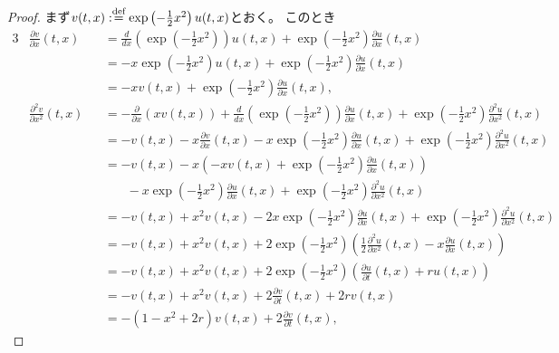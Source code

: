\documentclass[uplatex]{jsarticle}
\theoremstyle{definition}
\def\dfn{:\overset{\mbox{{\scriptsize def}}}{=}}
\begin{document}
\begin{proof}
  まず\(v(t,x) \dfn \exp\left(-\frac{1}{2}x^2\right)u(t,x)\)とおく。
  このとき
  \begin{alignat*}{3}
    &\frac{\partial v}{\partial x}(t,x) &
    &= \frac{d}{dx}\left( \exp\left(-\frac{1}{2}x^2\right) \right) u(t,x)
    + \exp\left(-\frac{1}{2}x^2\right) \frac{\partial u}{\partial x}(t,x) \\
    & &
    &= -x\exp\left(-\frac{1}{2}x^2\right) u(t,x)
    + \exp\left(-\frac{1}{2}x^2\right) \frac{\partial u}{\partial x}(t,x) \\
    & &
    &= -x v(t,x)
    + \exp\left(-\frac{1}{2}x^2\right) \frac{\partial u}{\partial x}(t,x), \\
    &\frac{\partial^2 v}{\partial x^2}(t,x) &
    &= - \frac{\partial }{\partial x}\left( xv(t,x)\right)
    + \frac{d}{dx}\left(\exp\left(-\frac{1}{2}x^2\right)\right)
    \frac{\partial u}{\partial x}(t,x)
    + \exp\left(-\frac{1}{2}x^2\right)\frac{\partial^2 u}{\partial x^2}(t,x) \\
    & &
    &= - v(t,x) - x \frac{\partial v}{\partial x}(t,x)
    - x\exp\left(-\frac{1}{2}x^2\right)\frac{\partial u}{\partial x}(t,x)
    + \exp\left(-\frac{1}{2}x^2\right)\frac{\partial^2 u}{\partial x^2}(t,x) \\
    & &
    &= - v(t,x) - x \left( -x v(t,x)
    + \exp\left(-\frac{1}{2}x^2\right) \frac{\partial u}{\partial x}(t,x)\right) \\
    & &
    &\ \ \ \ \ \ \ \
    - x\exp\left(-\frac{1}{2}x^2\right)\frac{\partial u}{\partial x}(t,x)
    + \exp\left(-\frac{1}{2}x^2\right)\frac{\partial^2 u}{\partial x^2}(t,x) \\
    & &
    &= - v(t,x) + x^2 v(t,x)
    - 2x \exp\left(-\frac{1}{2}x^2\right)\frac{\partial u}{\partial x}(t,x)
    + \exp\left(-\frac{1}{2}x^2\right)\frac{\partial^2 u}{\partial x^2}(t,x) \\
    & &
    &= - v(t,x) + x^2 v(t,x)
    + 2\exp\left(-\frac{1}{2}x^2\right)
    \left( \frac{1}{2}\frac{\partial^2 u}{\partial x^2}(t,x)
    - x\frac{\partial u}{\partial x}(t,x) \right) \\
    & &
    &= - v(t,x) + x^2 v(t,x)
    + 2\exp\left(-\frac{1}{2}x^2\right)
    \left( \frac{\partial u}{\partial t}(t,x) + ru(t,x) \right) \\
    & &
    &= - v(t,x) + x^2 v(t,x)
    + 2 \frac{\partial v}{\partial t}(t,x) + 2rv(t,x) \\
    & &
    &= - \left( 1 - x^2 + 2r\right)v(t,x)
    + 2 \frac{\partial v}{\partial t}(t,x),
  \end{alignat*}

\end{proof}
\end{document}
